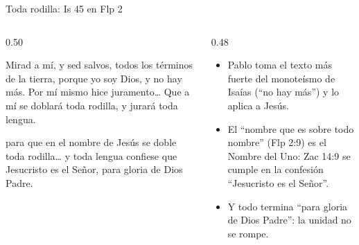 \begin{frame}{Toda rodilla: Is 45 en Flp 2}
\begin{columns}[t,onlytextwidth]
\begin{column}{0.50\textwidth}
\begin{cita}[fontupper=\scriptsize\itshape]Mirad a mí, y sed salvos, todos los términos de la tierra, porque yo soy Dios, y no hay más. Por mí mismo hice juramento\ldots{} Que a mí se doblará toda rodilla, y jurará toda lengua.\end{cita}
\begin{cita}[fontupper=\scriptsize\itshape]para que en el nombre de Jesús se doble toda rodilla\ldots{} y toda lengua confiese que Jesucristo es el Señor, para gloria de Dios Padre.\end{cita}
\end{column}
\begin{column}{0.48\textwidth}\small
\begin{itemize}
\item Pablo toma el texto más fuerte del monoteísmo de Isaías (``no hay más'') y lo aplica a Jesús.
\item El ``nombre que es sobre todo nombre'' (Flp 2:9) es el Nombre del Uno: Zac 14:9 se cumple en la confesión ``Jesucristo es el Señor''.
\item Y todo termina ``para gloria de Dios Padre'': la unidad no se rompe.
\end{itemize}
\end{column}
\end{columns}
\end{frame}

